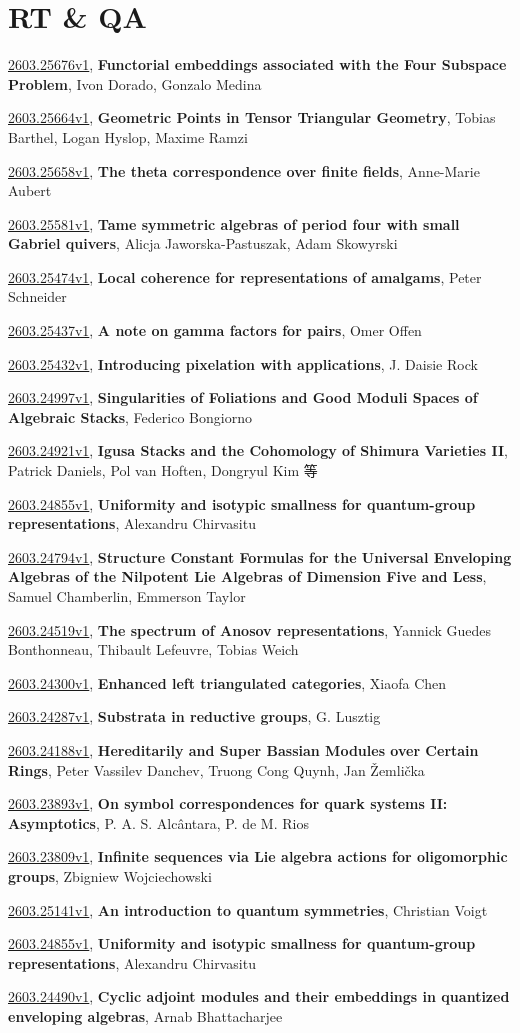 \documentclass[9pt, a4paper]{article}
\theoremstyle{plain}
\theoremstyle{definition}
\theoremstyle{remark}
\newcommand{\arxiv}[3]{\href{https://arxiv.org/abs/#1}{#1}, \textbf{\textcolor{arxivblue}{#2}}, #3}
\begin{document}

\section{RT \& QA}
\arxiv{2603.25676v1}{Functorial embeddings associated with the Four Subspace Problem}{Ivon Dorado, Gonzalo Medina}

\arxiv{2603.25664v1}{Geometric Points in Tensor Triangular Geometry}{Tobias Barthel, Logan Hyslop, Maxime Ramzi}

\arxiv{2603.25658v1}{The theta correspondence over finite fields}{Anne-Marie Aubert}

\arxiv{2603.25581v1}{Tame symmetric algebras of period four with small Gabriel quivers}{Alicja Jaworska-Pastuszak, Adam Skowyrski}

\arxiv{2603.25474v1}{Local coherence for representations of amalgams}{Peter Schneider}

\arxiv{2603.25437v1}{A note on gamma factors for pairs}{Omer Offen}

\arxiv{2603.25432v1}{Introducing pixelation with applications}{J. Daisie Rock}

\arxiv{2603.24997v1}{Singularities of Foliations and Good Moduli Spaces of Algebraic Stacks}{Federico Bongiorno}

\arxiv{2603.24921v1}{Igusa Stacks and the Cohomology of Shimura Varieties II}{Patrick Daniels, Pol van Hoften, Dongryul Kim 等}

\arxiv{2603.24855v1}{Uniformity and isotypic smallness for quantum-group representations}{Alexandru Chirvasitu}

\arxiv{2603.24794v1}{Structure Constant Formulas for the Universal Enveloping Algebras of the Nilpotent Lie Algebras of Dimension Five and Less}{Samuel Chamberlin, Emmerson Taylor}

\arxiv{2603.24519v1}{The spectrum of Anosov representations}{Yannick Guedes Bonthonneau, Thibault Lefeuvre, Tobias Weich}

\arxiv{2603.24300v1}{Enhanced left triangulated categories}{Xiaofa Chen}

\arxiv{2603.24287v1}{Substrata in reductive groups}{G. Lusztig}

\arxiv{2603.24188v1}{Hereditarily and Super Bassian Modules over Certain Rings}{Peter Vassilev Danchev, Truong Cong Quynh, Jan Žemlička}

\arxiv{2603.23893v1}{On symbol correspondences for quark systems II: Asymptotics}{P. A. S. Alcântara, P. de M. Rios}

\arxiv{2603.23809v1}{Infinite sequences via Lie algebra actions for oligomorphic groups}{Zbigniew Wojciechowski}

\arxiv{2603.25141v1}{An introduction to quantum symmetries}{Christian Voigt}

\arxiv{2603.24855v1}{Uniformity and isotypic smallness for quantum-group representations}{Alexandru Chirvasitu}

\arxiv{2603.24490v1}{Cyclic adjoint modules and their embeddings in quantized enveloping algebras}{Arnab Bhattacharjee}

\end{document}
